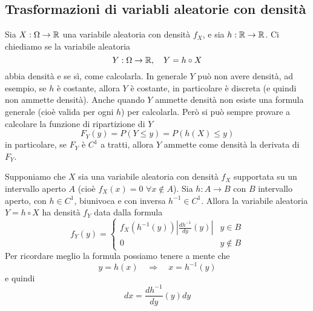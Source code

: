 \subsection{Trasformazioni di variabli aleatorie con densità}
Sia $X : \Omega \to \mathbb{R}$ una variabile aleatoria con densità $f_X$, e sia $h : \mathbb{R} \to \mathbb{R}$. Ci
chiediamo se la variabile aleatoria
\[ Y : \Omega \to \mathbb{R}, \quad Y = h \circ X \]
abbia densità e se sì, come calcolarla. In generale $Y$ può non avere densità, ad esempio, se $h$
è costante, allora $Y$ è costante, in particolare è discreta (e quindi non ammette densità).
Anche quando $Y$ ammette densità non esiste una formula generale (cioè valida per ogni $h$) per
calcolarla. Però si può sempre provare a calcolare la funzione di ripartizione di $Y$
\[ F_Y (y) = P(Y \leq y) = P(h(X) \leq y) \]
in particolare, se $F_Y$ è $C^1$ a tratti, allora $Y$ ammette come densità la derivata di $F_Y$.

\begin{proposition}\label{prop: cambio_var}
	Supponiamo che $X$ sia una variabile aleatoria con densità $f_X$ supportata su un intervallo
	aperto $A$ (cioè $f_X(x) = 0$ $\forall x \notin A$). Sia $h : A \to B$ con $B$ intervallo
	aperto, con $h \in C^1$, biunivoca e con inversa $h^{-1} \in C^1$. Allora la variabile
	aleatoria $Y = h \circ X$ ha densità $f_Y$ data dalla formula
	\[
		f_Y(y) = \begin{cases}
			f_X (h^{-1} (y)) \left| \frac{d h^{-1}}{dy} (y) \right| & y \in B    \\[1ex]
			0                                                       & y \notin B
		\end{cases}
	\]
	Per ricordare meglio la formula possiamo tenere a mente che
	\[ y = h(x) \quad \Rightarrow \quad x = h^{-1}(y) \]
	e quindi
	\[ dx = \frac{d h^{-1}}{dy} (y) dy \]
\end{proposition}

